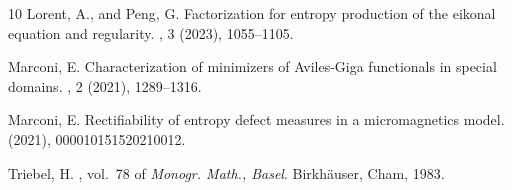 \documentclass[fleqn
]{article}
\numberwithin{equation}{section}
\theoremstyle{definition}
\begin{document}
\begin{thebibliography}{10}
{\sc Lorent, A., and Peng, G.}
\newblock Factorization for entropy production of the eikonal equation and
  regularity.
, 3 (2023), 1055--1105.

{\sc Marconi, E.}
\newblock Characterization of minimizers of {A}viles-{G}iga functionals in
  special domains.
, 2 (2021), 1289--1316.

{\sc Marconi, E.}
\newblock Rectifiability of entropy defect measures in a micromagnetics model.
 (2021),
  000010151520210012.

{\sc Triebel, H.}
, vol.~78 of {\em Monogr. Math.,
  Basel}.
\newblock Birkh{\"a}user, Cham, 1983.

\end{thebibliography}
\end{document}
